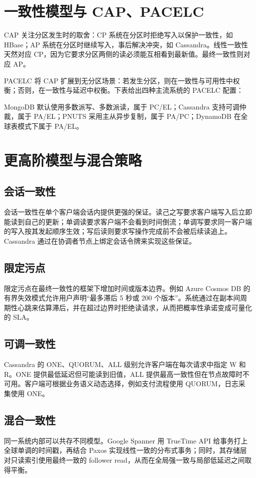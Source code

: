 \chapter{一致性模型与 CAP、PACELC}
CAP 关注分区发生时的取舍：CP 系统在分区时拒绝写入以保护一致性，如 HBase；AP 系统在分区时继续写入，事后解决冲突，如 Cassandra。线性一致性天然对应 CP，因为它要求分区两侧的读必须能互相看到最新值。最终一致性则对应 AP。\par
PACELC 将 CAP 扩展到无分区场景：若发生分区，则在一致性与可用性中权衡；否则，在一致性与延迟中权衡。下表给出四种主流系统的 PACELC 配置：\par
MongoDB 默认使用多数派写、多数派读，属于 PC/EL；Cassandra 支持可调仲裁，属于 PA/EL；PNUTS 采用主从异步复制，属于 PA/PC；DynamoDB 在全球表模式下属于 PA/EL。\par
\chapter{更高阶模型与混合策略}
\section{会话一致性}
会话一致性在单个客户端会话内提供更强的保证。读己之写要求客户端写入后立即能读到自己的更新；单调读要求客户端不会看到时间倒流；单调写要求同一客户端的写入按其发起顺序生效；写后读则要求写操作完成前不会被后续读追上。Cassandra 通过在协调者节点上绑定会话令牌来实现这些保证。\par
\section{限定污点}
限定污点在最终一致性的框架下增加时间或版本边界。例如 Azure Cosmos DB 的有界失效模式允许用户声明“最多滞后 5 秒或 200 个版本”。系统通过在副本间周期性心跳来估算滞后，并在超过边界时拒绝读请求，从而把概率性承诺变成可量化的 SLA。\par
\section{可调一致性}
Cassandra 的 ONE、QUORUM、ALL 级别允许客户端在每次请求中指定 W 和 R。ONE 提供最低延迟但可能读到旧值，ALL 提供最高一致性但在节点故障时不可用。客户端可根据业务语义动态选择，例如支付流程使用 QUORUM，日志采集使用 ONE。\par
\section{混合一致性}
同一系统内部可以共存不同模型。Google Spanner 用 TrueTime API 给事务打上全球单调的时间戳，再结合 Paxos 实现线性一致的分布式事务；同时，其存储层对只读索引使用最终一致的 follower read，从而在全局强一致与局部低延迟之间取得平衡。\par
